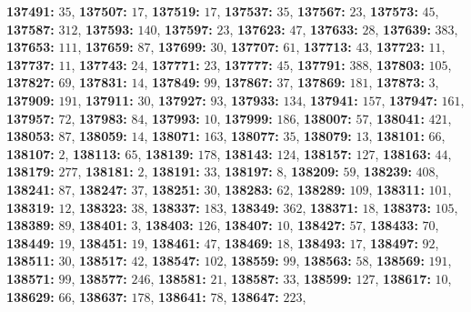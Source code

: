 \textsf{\bfseries 137491:} $35$, \textsf{\bfseries 137507:} $17$, \textsf{\bfseries 137519:} $17$, \textsf{\bfseries 137537:} $35$, \textsf{\bfseries 137567:} $23$, \textsf{\bfseries 137573:} $45$, \textsf{\bfseries 137587:} $312$, \textsf{\bfseries 137593:} $140$, \textsf{\bfseries 137597:} $23$, \textsf{\bfseries 137623:} $47$, \textsf{\bfseries 137633:} $28$, \textsf{\bfseries 137639:} $383$, \textsf{\bfseries 137653:} $111$, \textsf{\bfseries 137659:} $87$, \textsf{\bfseries 137699:} $30$, \textsf{\bfseries 137707:} $61$, \textsf{\bfseries 137713:} $43$, \textsf{\bfseries 137723:} $11$, \textsf{\bfseries 137737:} $11$, \textsf{\bfseries 137743:} $24$, \textsf{\bfseries 137771:} $23$, \textsf{\bfseries 137777:} $45$, \textsf{\bfseries 137791:} $388$, \textsf{\bfseries 137803:} $105$, \textsf{\bfseries 137827:} $69$, \textsf{\bfseries 137831:} $14$, \textsf{\bfseries 137849:} $99$, \textsf{\bfseries 137867:} $37$, \textsf{\bfseries 137869:} $181$, \textsf{\bfseries 137873:} $3$, \textsf{\bfseries 137909:} $191$, \textsf{\bfseries 137911:} $30$, \textsf{\bfseries 137927:} $93$, \textsf{\bfseries 137933:} $134$, \textsf{\bfseries 137941:} $157$, \textsf{\bfseries 137947:} $161$, \textsf{\bfseries 137957:} $72$, \textsf{\bfseries 137983:} $84$, \textsf{\bfseries 137993:} $10$, \textsf{\bfseries 137999:} $186$, \textsf{\bfseries 138007:} $57$, \textsf{\bfseries 138041:} $421$, \textsf{\bfseries 138053:} $87$, \textsf{\bfseries 138059:} $14$, \textsf{\bfseries 138071:} $163$, \textsf{\bfseries 138077:} $35$, \textsf{\bfseries 138079:} $13$, \textsf{\bfseries 138101:} $66$, \textsf{\bfseries 138107:} $2$, \textsf{\bfseries 138113:} $65$, \textsf{\bfseries 138139:} $178$, \textsf{\bfseries 138143:} $124$, \textsf{\bfseries 138157:} $127$, \textsf{\bfseries 138163:} $44$, \textsf{\bfseries 138179:} $277$, \textsf{\bfseries 138181:} $2$, \textsf{\bfseries 138191:} $33$, \textsf{\bfseries 138197:} $8$, \textsf{\bfseries 138209:} $59$, \textsf{\bfseries 138239:} $408$, \textsf{\bfseries 138241:} $87$, \textsf{\bfseries 138247:} $37$, \textsf{\bfseries 138251:} $30$, \textsf{\bfseries 138283:} $62$, \textsf{\bfseries 138289:} $109$, \textsf{\bfseries 138311:} $101$, \textsf{\bfseries 138319:} $12$, \textsf{\bfseries 138323:} $38$, \textsf{\bfseries 138337:} $183$, \textsf{\bfseries 138349:} $362$, \textsf{\bfseries 138371:} $18$, \textsf{\bfseries 138373:} $105$, \textsf{\bfseries 138389:} $89$, \textsf{\bfseries 138401:} $3$, \textsf{\bfseries 138403:} $126$, \textsf{\bfseries 138407:} $10$, \textsf{\bfseries 138427:} $57$, \textsf{\bfseries 138433:} $70$, \textsf{\bfseries 138449:} $19$, \textsf{\bfseries 138451:} $19$, \textsf{\bfseries 138461:} $47$, \textsf{\bfseries 138469:} $18$, \textsf{\bfseries 138493:} $17$, \textsf{\bfseries 138497:} $92$, \textsf{\bfseries 138511:} $30$, \textsf{\bfseries 138517:} $42$, \textsf{\bfseries 138547:} $102$, \textsf{\bfseries 138559:} $99$, \textsf{\bfseries 138563:} $58$, \textsf{\bfseries 138569:} $191$, \textsf{\bfseries 138571:} $99$, \textsf{\bfseries 138577:} $246$, \textsf{\bfseries 138581:} $21$, \textsf{\bfseries 138587:} $33$, \textsf{\bfseries 138599:} $127$, \textsf{\bfseries 138617:} $10$, \textsf{\bfseries 138629:} $66$, \textsf{\bfseries 138637:} $178$, \textsf{\bfseries 138641:} $78$, \textsf{\bfseries 138647:} $223$, 
